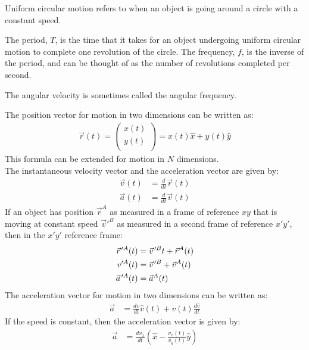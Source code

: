 \begin{chapterSummary}
{\item Uniform circular motion refers to when an object is going around a circle with a constant speed.

\item The period, $T$, is the time that it takes for an object undergoing uniform circular motion to complete one revolution of the circle. The frequency, $f$, is the inverse of the period, and can be thought of as the number of revolutions completed per second.

\item The angular velocity is sometimes called the angular frequency.}
\end{chapterSummary}

\newpage
\begin{importantEquations}
The position vector for motion in two dimensions can be written as:
\begin{align*}
\vec r(t) = \begin{pmatrix}
          x(t) \\
          y(t) \\
        \end{pmatrix}= x(t) \hat x + y(t) \hat y
\end{align*}
This formula can be extended for motion in $N$ dimensions.\\
The instantaneous velocity vector and the acceleration vector are given by:
\begin{align*}
\vec v(t) &=\frac{d}{dt}\vec r(t)\\
\vec a(t) &= \frac{d}{dt}\vec v(t)
\end{align*}
If an object has position $\vec{r}^A$ as measured in a frame of reference $xy$ that is moving at constant speed $\vec{v}'^B$ as measured in a second frame of reference $x'y'$, then in the $x'y'$ reference frame:
\begin{align*}
\pvec r'^A(t) &= \pvec v'^Bt+\vec r^A(t)\\
v'^A(t) &=\pvec v'^B+\vec v^A(t)\\
\pvec a'^A(t)&=\vec a^A(t)
\end{align*}
The acceleration vector for motion in two dimensions can be written as:
\begin{align*}
\vec a&=\frac{dv}{dt}\hat v(t)+v(t)\frac{d\hat v}{dt}
\end{align*}
If the speed is constant, then the acceleration vector is given by:
\begin{align*}
\vec a&=\frac{dv_x}{dt} \left(\hat x - \frac{v_x(t)}{v_y(t)}\hat y\right)
\end{align*}

\end{importantEquations}

